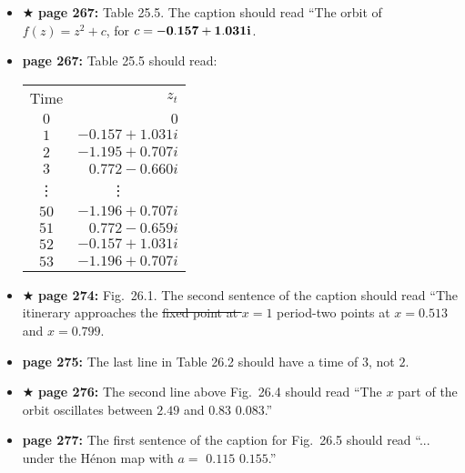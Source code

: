 \documentclass[12pt]{article}
\begin{document}
\begin{itemize}
  \item $\bigstar$ {\bf page 267:}  Table 25.5.  The caption should
    read ``The orbit of $f(z) = z^2 + c$, for $c = {\bf -0.157 + 1.031i}$.

  \item {\bf page 267:}  Table 25.5 should read:
\begin{center}
\begin{tabular}{c r}
\hline
\vspace{2mm}Time & $z_t$ \\
$0$ & \hspace{18mm}$0$ \\
$1$ &	$-0.157 + 1.031i$ \\
$2$ &	$-1.195	+ 0.707i$ \\
$3$ &	$0.772	 -0.660i$ \\
\vdots & \vdots $\;\;\;\;\;\;\;\;\;\;\;\;\;$\\
$50$ &	$-1.196 +  0.707i$ \\
$51$ &	$0.772  -0.659i$ \\
$52$ &	$-0.157 + 1.031i$ \\
$53$ &  $-1.196 + 0.707i$ \\
\hline
\end{tabular}
\end{center}




  \item $\bigstar$ {\bf page 274:} Fig.~26.1.  The second sentence of
    the caption should read ``The itinerary approaches the
    \sout{fixed point at $x=1$} period-two points at $x=0.513$ and 
    $x=0.799$. 

  \item {\bf page 275:} The last line in Table 26.2 should have a time
    of $3$, not $2$.

  \item $\bigstar$ {\bf page 276:}  The second line above Fig.~26.4
    should read ``The $x$ part of the orbit oscillates between $2.49$
    and \sout{$0.83$} {\bf $0.083$}.'' 


  \item {\bf page 277:}  The first sentence of the caption for
    Fig.~26.5 should read ``... under the H\'enon map with $a = $
    \sout{$0.115$} {\bf $0.155$}.''


\end{itemize}
\end{document}
